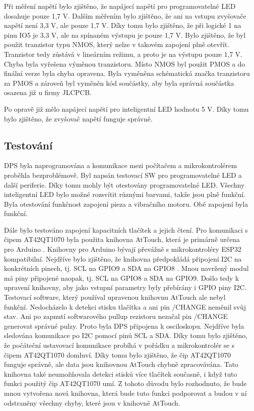 Při měření napětí bylo zjištěno, že napájecí napětí pro programovatelné LED dosahuje pouze 1,7 V. Dalším měřením bylo zjištěno, že ani na vstupu zvyšovače napětí není 3,3 V, ale 
pouze 1,7 V. Díky tomu bylo zjištěno, že při logické 1 na pinu IO5 je 3,3 V, ale na spínaném výstupu je pouze 1,7 V. Bylo zjištěno, že byl použit tranzistor typu NMOS, který nelze 
v takovém zapojení plně otevřít. Tranzistor tedy zůstává v lineárním režimu, a proto je na výstupu pouze 1,7 V. Chyba byla vyřešena výměnou tranzistoru. Místo NMOS byl použit PMOS 
a do finální verze byla chyba opravena. Byla vyměněna schématická značka tranzistoru za PMOS a zároveň byl vyměněn kód součástky, aby byla správná součástka osazena již u firmy JLCPCB. 

Po opravě již mělo napájecí napětí pro inteligentní LED hodnotu 5 V. Díky tomu bylo zjištěno, že zvyšovač napětí funguje správně. 

\subsection{Testování}
DPS byla naprogramována a komunikace mezi počítačem a mikrokontrolérem proběhla bezproblémově. Byl napsán testovací SW pro programovatelné LED 
a další periferie. Díky tomu mohly být otestovány programovatelné LED. Všechny inteligentní LED bylo možné rozsvítit různými barvami, takže jsou plně funkční. Byla otestování funkčnost 
zapojení pieza a vibračního motoru. Obě zapojení byla funkční. 

Dále bylo testováno zapojení kapacitních tlačítek a jejich čtení. Pro komunikaci s čipem AT42QT1070 byla použita knihovna AtTouch, která je primárně určena pro Arduino \cite{AtTouch}. 
Knihovny pro Arduino bývají převážně s mikrokontroléry ESP32 kompatibilní. Nejdříve bylo zjištěno, že knihovna předpokládá připojení I2C na konkrétních pinech, tj. SCL na GPIO9 a SDA 
na GPIO8 \cite{AtTouch}. Mnou navržený modul má piny připojené naopak, tj. SCL na GPIO8 a SDA na GPIO9. Došlo tedy k upravení knihovny, aby jako vstupní parametry byly přebírány i GPIO 
piny I2C. Testovací software, který používal upravenou knihovnu AtTouch ale nebyl funkční. Nedocházelo k detekci stisku tlačítka a ani pin /CHANGE neměnil svůj stav. Ani po zapnutí 
softwarového pullup rezistoru nezačal pin /CHANGE generovat správné pulzy. Proto byla DPS 
připojena k osciloskopu. Nejdříve byla sledována komunikace po I2C pomocí pinů SCL a SDA. Díky tomu bylo zjištěno, že počáteční ustavovací komunikace probíhá v pořádku a mikrokontrolér 
se s čipem AT42QT1070 domluví. Díky tomu bylo zjištěno, že čip AT42QT1070 funguje správně, ale data jsou knihovnou AtTouch chybně zpracovávána. Tato knihovna také neumožňovala detekci 
stisků více tlačítek současně, i když tuto funkci použitý čip AT42QT1070 umí. Z tohoto důvodu bylo rozhodnuto, že bude mnou vytvořena nová knihovna, která bude tuto funkci podporovat 
a budou v ní odstraněny všechny chyby, které jsou v knihovně AtTouch. 

